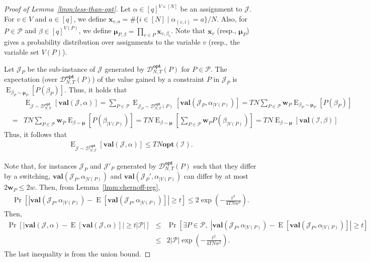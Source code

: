 \documentclass[letterpaper, 11pt]{article}
\newcommand{\calD}{\mathcal{D}}
\newcommand{\calI}{\mathcal{I}}
\newcommand{\calJ}{\mathcal{J}}
\newcommand{\calP}{\mathcal{P}}
\newcommand{\biw}{\boldsymbol{w}}
\newcommand{\bix}{\boldsymbol{x}}
\newcommand{\bimu}{\boldsymbol{\mu}}
\newcommand{\opt}{\mathbf{opt}}
\newcommand{\val}{\mathbf{val}}
\newcommand{\E}{\mathop{\mathrm{E}}}
\begin{document}
\begin{proof}[Proof of Lemma~\ref{lmm:less-than-opt}]
  Let $\alpha \in [q]^{V\times [N]}$ be an assignment to $\calJ$.
  For $v\in V$ and $a\in [q]$, we define $\bix_{v,a}=\#\{i \in [N] \mid \alpha_{(v,i)}=a\}/N$.
  Also, for $P\in \calP$ and $\beta\in [q]^{V(P)}$, we define $\bimu_{P,\beta}=\prod_{v\in P}\bix_{v,\beta_v}$.
  Note that $\bix_v$ (resp., $\bimu_P$) gives a probability distribution over assignments to the variable $v$ (resp., the variable set $V(P)$).

  Let $\calJ_P$ be the sub-instance of $\calJ$ generated by $\calD_{N,T}^{\opt}(P)$ for $P\in \calP$.
  The expectation (over $\calD_{N,T}^{\opt}(P)$) of the value gained by a constraint $P$ in $\calJ_P$ is $\E_{\beta_P\sim \bimu_P}\left[P(\beta_P)\right]$.
  Thus, it holds that
  \begin{eqnarray*}
    &&\E_{\calJ \sim \calD_{N,T}^{\opt}}[\val(\calJ,\alpha)] 
    =
    \sum_{P\in \calP}\E_{\calJ_P \sim \calD_{N,T}^{\opt}(P)}[\val(\calJ_P,\alpha_{|V(P)})]
    =
    TN\sum_{P\in \calP}\biw_P  \E_{\beta_P \sim \bimu_P}[P(\beta_P)] \\
    &=&
    TN\sum_{P\in \calP}\biw_P \E_{\beta \sim \bimu}[P(\beta_{|V(P)})]
    =
    TN\E_{\beta \sim \bimu}[\sum_{P\in \calP}\biw_PP(\beta_{|V(P)})]
    =
    TN\E_{\beta \sim \bimu}[\val(\calI,\beta)]
  \end{eqnarray*}
  Thus, it follows that
  \begin{eqnarray}
    \E_{\calJ \sim \calD_{N,T}^{\opt}}[\val(\calJ,\alpha)]  \leq TN\opt(\calI). \label{eq:less-than-opt-1}
  \end{eqnarray}

  Note that, for instances $\calJ_P$ and $\calJ'_P$ generated by $\calD_{N,T}^{\opt}(P)$ such that they differ by a switching,
  $\val(\calJ_P,\alpha_{|V(P)})$ and $\val(\calJ_P',\alpha_{|V(P)})$ can differ by at most $2\biw_P\leq 2w$.
  Then, from Lemma~\ref{lmm:chernoff-reg}, 
  \begin{eqnarray*}
    \Pr\left[\left|\val(\calJ_P,\alpha_{|V(P)})-\E[\val(\calJ_P,\alpha_{|V(P)})]\right|\geq t \right]
    \leq
    2\exp\left(-\frac{t^2}{4TN w^2}\right).
  \end{eqnarray*}
  Then,
  \begin{eqnarray*}
    \Pr \left[|\val(\calJ,\alpha)-\E[\val(\calJ,\alpha)]|\geq t|\calP| \right]
    &\leq &
    \Pr \left[\exists P\in \calP,\; |\val(\calJ_P,\alpha_{|V(P)})-\E[\val(\calJ_P,\alpha_{|V(P)})]|\geq t \right] \\
    &\leq&
    2|\calP|\exp\left(-\frac{t^2}{4TN w^2}\right).
  \end{eqnarray*}
  The last inequality is from the union bound.


\end{proof}
\end{document}
